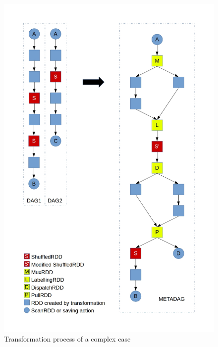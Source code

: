 \begin{figure}
\includegraphics[width=\textwidth]{Figures/complexmetajob.jpg}
\caption{Transformation process of a complex case}
\label{fig:complexmetajob}
\end{figure}

